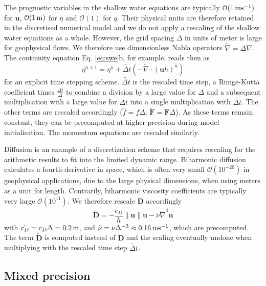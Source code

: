 The prognostic variables in the shallow water equations are typically
$\mathcal{O}(1\operatorname{ms}^{-1})$ for $\mathbf{u}$, $\mathcal{O}(1\operatorname{m})$ for
$\eta$ and $\mathcal{O}(1)$ for $q$. Their physical units are therefore retained
in the discretised numerical model and we do not apply a rescaling of the shallow
water equations as a whole. However, the grid spacing $\Delta$ in units of meter
is large for geophysical flows. We therefore use dimensionless Nabla operators
$\tilde{\nabla} = \Delta\nabla$. The continuity equation Eq. \ref{eq:swe}b,
for example, reads then as
\begin{equation}
\eta^{n+1} = \eta^n + \tilde{\Delta t}\left( - \tilde{\nabla} \cdot (\mathbf{u}h)^n\right)
\label{eq:discr}
\end{equation}
for an explicit time stepping scheme. $\tilde{\Delta t}$ is the rescaled time
step, a Runge-Kutta coefficient times $\tfrac{\Delta t}{\Delta}$ to combine a
division by a large value for $\Delta$ and a subsequent multiplication with a
large value for $\Delta t$ into a single multiplication with $\tilde{\Delta t}$.
The other terms are rescaled accordingly ($\tilde{f} = f\Delta$;
$\tilde{\mathbf{F}} = \mathbf{F}\Delta$). As these terms remain constant, they
can be precomputed at higher precision during model initialisation.
The momentum equations are rescaled similarly.

Diffusion is an example of a discretization scheme that requires rescaling for
the arithmetic results to fit into the limited dynamic range. Biharmonic diffusion
\citep{Griffies2000} calculates a fourth-derivative in space,
which is often very small $\mathcal{O}(10^{-20})$ in geophysical applications,
due to the large physical dimensions, when using meters as a unit for length.
Contrarily, biharmonic viscosity coefficients are typically very large
$\mathcal{O}(10^{11})$.
We therefore rescale $\mathbf{D}$ accordingly
\begin{equation}
\tilde{\mathbf{D}} =-\frac{\tilde{c_D}}{h}\| \mathbf{u} \| \mathbf{u} -
\tilde{\nu}\tilde{\nabla}^4\mathbf{u}
\end{equation}
with $\tilde{c_D} = c_D\Delta = 0.2\operatorname{m}$,  and $\tilde{\nu} = \nu\Delta^{-3}
\approx 0.16\operatorname{ms}^{-1}$, which are precomputed. The term
$\tilde{\mathbf{D}}$ is computed instead of $\mathbf{D}$ and the scaling eventually
undone when multiplying with the rescaled time step $\tilde{\Delta t}$.

\subsection{Mixed precision}

